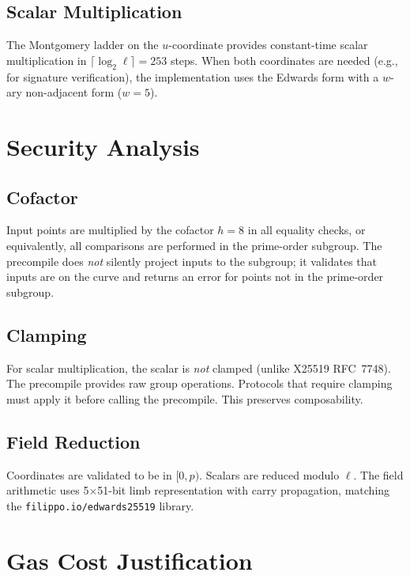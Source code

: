 \documentclass[11pt,a4paper]{article}
\begin{document}
\subsection{Scalar Multiplication}

The Montgomery ladder on the $u$-coordinate provides constant-time scalar
multiplication in $\lceil\log_2 \ell\rceil = 253$ steps. When both coordinates
are needed (e.g., for signature verification), the implementation uses the
Edwards form with a $w$-ary non-adjacent form ($w = 5$).

\section{Security Analysis}

\subsection{Cofactor}

Input points are multiplied by the cofactor $h = 8$ in all equality checks,
or equivalently, all comparisons are performed in the prime-order subgroup.
The precompile does \emph{not} silently project inputs to the subgroup; it
validates that inputs are on the curve and returns an error for points not
in the prime-order subgroup.

\subsection{Clamping}

For scalar multiplication, the scalar is \emph{not} clamped (unlike X25519 RFC~7748).
The precompile provides raw group operations. Protocols that require clamping must
apply it before calling the precompile. This preserves composability.

\subsection{Field Reduction}

Coordinates are validated to be in $[0, p)$. Scalars are reduced modulo $\ell$.
The field arithmetic uses 5$\times$51-bit limb representation with carry
propagation, matching the \texttt{filippo.io/edwards25519} library.

\section{Gas Cost Justification}
\end{document}
